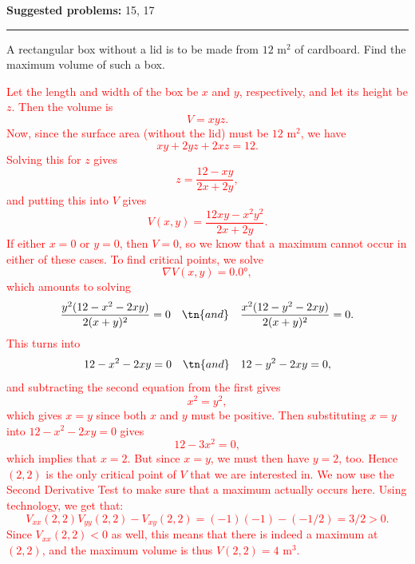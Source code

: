 \documentclass[12pt,reqno]{amsart}
\begin{document}
\textbf{Suggested problems:} 15, 17

\bigskip
\hrule

\bigskip

\prob A rectangular box without a lid is to be made from $12$ m$^2$ of cardboard. Find the maximum volume of such a box.

\bigskip
\textcolor{red}{Let the length and width of the box be $x$ and $y$, respectively, and let its height be $z$. Then the volume is
	\[V = xyz.
	\]
Now, since the surface area (without the lid) must be $12$ m$^2$, we have
	\[xy + 2yz + 2xz = 12.
	\]
Solving this for $z$ gives
	\[z = \frac{12-xy}{2x+2y},
	\]
and putting this into $V$ gives
	\[V(x,y) = \frac{12xy - x^2y^2}{2x+2y}.
	\]
If either $x=0$ or $y=0$, then $V=0$, so we know that a maximum cannot occur in either of these cases. To find critical points, we solve
	\[\nabla V(x,y) = \ang{0,0},
	\]
which amounts to solving
	\[\frac{y^2(12-x^2-2xy)}{2(x+y)^2} = 0 \quad \tn{and} \quad \frac{x^2(12-y^2-2xy)}{2(x+y)^2} = 0.
	\]
This turns into
	\[12-x^2-2xy = 0 \quad \tn{and} \quad 12-y^2-2xy = 0,
	\]
and subtracting the second equation from the first gives
	\[x^2=y^2,
	\]
which gives $x=y$ since both $x$ and $y$ must be positive. Then substituting $x=y$ into $12-x^2-2xy=0$ gives
	\[12-3x^2=0,
	\]
which implies that $x=2$. But since $x=y$, we must then have $y=2$, too. Hence $(2,2)$ is the only critical point of $V$ that we are interested in. We now use the Second Derivative Test to make sure that a maximum actually occurs here. Using technology, we get that:
	\[V_{xx}(2,2)V_{yy}(2,2) - V_{xy}(2,2) = (-1)(-1)-(-1/2) = 3/2>0.
	\]
Since $V_{xx}(2,2)<0$ as well, this means that there is indeed a maximum at $(2,2)$, and the maximum volume is thus $V(2,2) = 4$ m$^3$.}
\end{document}

